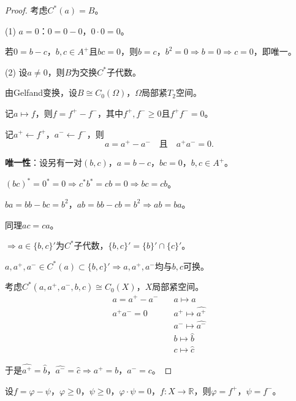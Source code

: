 \documentclass[lang=cn,a4paper,newtx,section]{elegantbook}
\begin{document}
\begin{proof}
  考虑$C^*(a) = B$。
  
  (1) $a = 0$：$0 = 0 - 0$，$0 \cdot 0 = 0$。
  
  若$0 = b - c$，$b, c \in A^+$且$bc = 0$，则$b = c$，$b^2 = 0 \Rightarrow b = 0 \Rightarrow c = 0$，即唯一。
  
  (2) 设$a \neq 0$，则$B$为交换$C^*$子代数。
  
  由Gelfand变换，设$B \cong C_0(\Omega)$，$\Omega$局部紧$T_2$空间。
  
  记$a \mapsto f$，则$f = f^+ - f^-$，其中$f^+, f^- \geq 0$且$f^+ f^- = 0$。
  
  记$a^+ \leftarrow f^+$，$a^- \leftarrow f^-$，则
  \begin{equation*}
    a = a^+ - a^- \quad \text{且} \quad a^+ a^- = 0.
  \end{equation*}
  
  \textbf{唯一性}：设另有一对$(b, c)$，$a = b - c$，$bc = 0$，$b, c \in A^+$。
  
  $(bc)^* = 0^* = 0 \Rightarrow c^* b^* = cb = 0 \Rightarrow bc = cb$。
  
  $ba = bb - bc = b^2$，$ab = bb - cb = b^2 \Rightarrow ab = ba$。
  
  同理$ac = ca$。
  
  $\Rightarrow a \in \{b, c\}'$为$C^*$子代数，$\{b, c\}' = \{b\}' \cap \{c\}'$。
  
  $a, a^+, a^- \in C^*(a) \subset \{b, c\}' \Rightarrow a, a^+, a^-$均与$b, c$可换。
  
  考虑$C^*(a, a^+, a^-, b, c) \cong C_0(X)$，$X$局部紧空间。
  \begin{equation*}
    \begin{aligned}
      a = a^+ - a^- &\quad a \mapsto \hat{a} \\
      a^+ a^- = 0 &\quad a^+ \mapsto \widehat{a^+} \\
      &\quad a^- \mapsto \widehat{a^-} \\
      &\quad b \mapsto \hat{b} \\
      &\quad c \mapsto \hat{c}
    \end{aligned}
  \end{equation*}
  
  于是$\widehat{a^+} = \hat{b}$，$\widehat{a^-} = \hat{c} \Rightarrow a^+ = b$，$a^- = c$。
\end{proof}

\begin{proposition}
  设$f = \varphi - \psi$，$\varphi \geq 0$，$\psi \geq 0$，$\varphi \cdot \psi = 0$，$f: X \to \mathbb{R}$，则$\varphi = f^+$，$\psi = f^-$。
\end{proposition}
\end{document}
